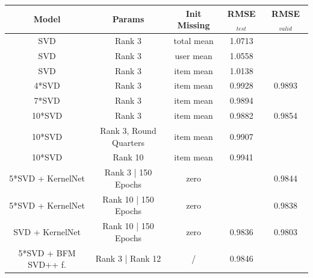 \documentclass[10pt,conference,compsocconf]{IEEEtran}
\begin{document}
    \begin{table}[h]
        \centering
        \begin{tabular}{|| c | c | c | c | c ||}
            \hline
            \textbf{Model}       & \textbf{Params}                       & \textbf{ Init Missing } & \textbf{RMSE}$_{test}$ & \textbf{RMSE}$_{valid}$ \\
            \hline
            SVD                  & Rank 3                                & total mean              & 1.0713                 &                         \\
            SVD                  & Rank 3                                & user mean               & 1.0558                 &                         \\
            SVD                  & Rank 3                                & item mean               & 1.0138                 &                         \\
            4*SVD                & Rank 3                                & item mean               & 0.9928                 & 0.9893                  \\
            7*SVD                & Rank 3                                & item mean               & 0.9894                 &                         \\
            10*SVD               & Rank 3                                & item mean               & 0.9882                 & 0.9854                  \\
            10*SVD               & Rank 3, Round Quarters                & item mean               & 0.9907                 &                         \\
            10*SVD               & Rank 10                               & item mean               & 0.9941                 &                         \\
            5*SVD + KernelNet    & Rank 3 | 150 Epochs                   & zero                    &                        & 0.9844                  \\
            5*SVD + KernelNet    & Rank 10 | 150 Epochs                  & zero                    &                        & 0.9838                  \\
            SVD + KernelNet      & Rank 10 | 150 Epochs                  & zero                    & 0.9836                 & 0.9803                  \\
            5*SVD + BFM SVD++ f. & Rank 3 | Rank 12                      & /                       & 0.9846                 &                         \\

\end{tabular}
\end{table}
\end{document}
